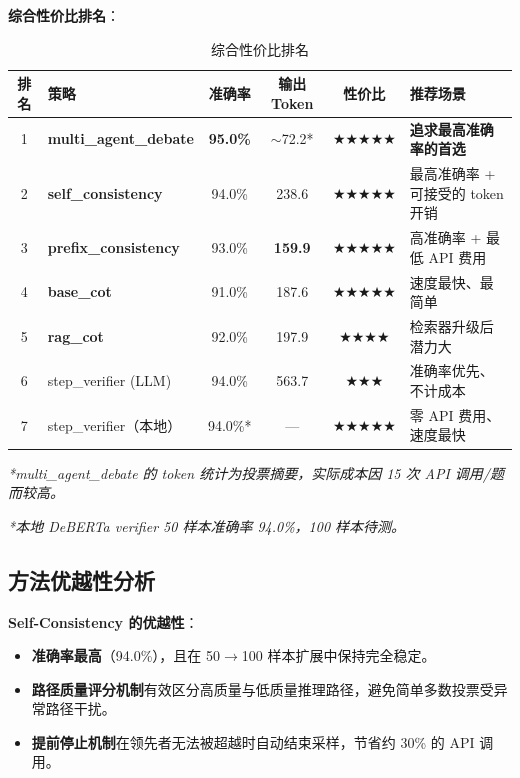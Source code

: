 \documentclass[lang=cn,a4paper,newtx]{elegantpaper}
\begin{document}
\textbf{综合性价比排名}：

\begin{table}[htbp]
\centering
\caption{综合性价比排名}
\begin{tabular}{clcccl}
\toprule
排名 & 策略 & 准确率 & 输出 Token & 性价比 & 推荐场景 \\
\midrule
1 & \textbf{multi\_agent\_debate} & \textbf{95.0\%} & $\sim$72.2* & $\bigstar\bigstar\bigstar\bigstar\bigstar$ & \textbf{追求最高准确率的首选} \\
2 & \textbf{self\_consistency} & 94.0\% & 238.6 & $\bigstar\bigstar\bigstar\bigstar\bigstar$ & 最高准确率 + 可接受的 token 开销 \\
3 & \textbf{prefix\_consistency} & 93.0\% & \textbf{159.9} & $\bigstar\bigstar\bigstar\bigstar\bigstar$ & 高准确率 + 最低 API 费用 \\
4 & \textbf{base\_cot} & 91.0\% & 187.6 & $\bigstar\bigstar\bigstar\bigstar\bigstar$ & 速度最快、最简单 \\
5 & \textbf{rag\_cot} & 92.0\% & 197.9 & $\bigstar\bigstar\bigstar\bigstar$ & 检索器升级后潜力大 \\
6 & step\_verifier (LLM) & 94.0\% & 563.7 & $\bigstar\bigstar\bigstar$ & 准确率优先、不计成本 \\
7 & step\_verifier（本地） & 94.0\%* & --- & $\bigstar\bigstar\bigstar\bigstar\bigstar$ & 零 API 费用、速度最快 \\
\bottomrule
\end{tabular}
\end{table}

\textit{*multi\_agent\_debate 的 token 统计为投票摘要，实际成本因 15 次 API 调用/题而较高。}

\textit{*本地 DeBERTa verifier 50 样本准确率 94.0\%，100 样本待测。}

\subsection{方法优越性分析}

\textbf{Self-Consistency 的优越性}：

\begin{itemize}
  \item \textbf{准确率最高}（94.0\%），且在 50$\rightarrow$100 样本扩展中保持完全稳定。
  \item \textbf{路径质量评分机制}有效区分高质量与低质量推理路径，避免简单多数投票受异常路径干扰。
  \item \textbf{提前停止机制}在领先者无法被超越时自动结束采样，节省约 30\% 的 API 调用。
\end{itemize}
\end{document}
